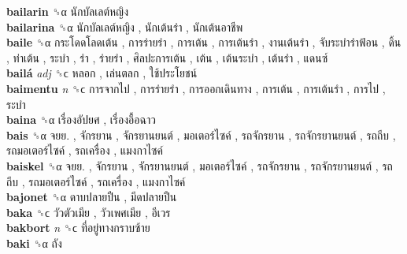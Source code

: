\textbf{bailarin} ␝α   นักบัลเลต์หญิง   \\
\textbf{bailarina} ␝α   นักบัลเลต์หญิง ,  นักเต้นรำ ,  นักเต้นอาชีพ   \\
\textbf{baile} ␝α   กระโดดโลดเต้น ,  การร่ายรำ ,  การเต้น ,  การเต้นรำ ,  งานเต้นรำ ,  จับระบำรำฟ้อน ,  ดิ้น ,  ท่าเต้น ,  ระบำ ,  รำ ,  ร่ายรำ ,  ศิลปะการเต้น ,  เต้น ,  เต้นระบำ ,  เต้นรำ ,  แดนซ์   \\
\textbf{bailá} \emph{adj}  ␝ϲ   หลอก ,  เล่นตลก ,  ใช้ประโยชน์   \\
\textbf{baimentu} \emph{n}  ␝ϲ   การจากไป ,  การร่ายรำ ,  การออกเดินทาง ,  การเต้น ,  การเต้นรำ ,  การไป ,  ระบำ   \\
\textbf{baina} ␝α   เรื่องอัปยศ ,  เรื่องอื้อฉาว   \\
\textbf{bais} ␝α   จยย. ,  จักรยาน ,  จักรยานยนต์ ,  มอเตอร์ไซค์ ,  รถจักรยาน ,  รถจักรยานยนต์ ,  รถถีบ ,  รถมอเตอร์ไซค์ ,  รถเครื่อง ,  แมงกาไซค์   \\
\textbf{baiskel} ␝α   จยย. ,  จักรยาน ,  จักรยานยนต์ ,  มอเตอร์ไซค์ ,  รถจักรยาน ,  รถจักรยานยนต์ ,  รถถีบ ,  รถมอเตอร์ไซค์ ,  รถเครื่อง ,  แมงกาไซค์   \\
\textbf{bajonet} ␝α   ดาบปลายปืน ,  มีดปลายปืน   \\
\textbf{baka} ␝ϲ   วัวตัวเมีย ,  วัวเพศเมีย ,  อีเวร   \\
\textbf{bakbort} \emph{n}  ␝ϲ   ที่อยู่ทางกราบซ้าย   \\
\textbf{baki} ␝α   ถัง   \\
